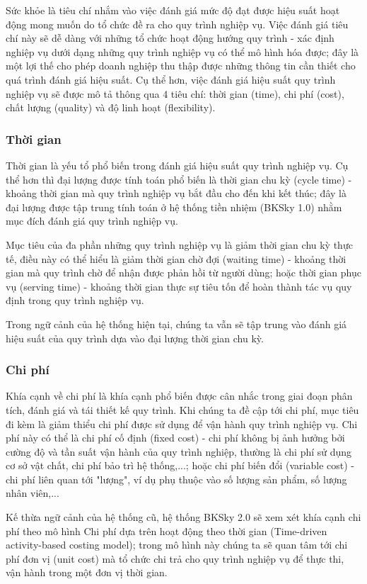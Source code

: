 Sức khỏe là tiêu chí nhắm vào việc đánh giá mức độ đạt được hiệu suất hoạt động
mong muốn do tổ chức đề ra cho quy trình nghiệp vụ. Việc đánh giá tiêu chí này
sẽ dễ dàng với những tổ chức hoạt động hướng quy trình - xác định nghiệp vụ
dưới dạng những quy trình nghiệp vụ có thể mô hình hóa được; đây là một lợi thế
cho phép doanh nghiệp thu thập được những thông tin cần thiết cho quá trình
đánh giá hiệu suất. Cụ thể hơn, việc đánh giá hiệu suất quy trình nghiệp vụ sẽ
được mô tả thông qua 4 tiêu chí: thời gian (time), chi phí (cost), chất lượng
(quality) và độ linh hoạt (flexibility).
\subsubsection{Thời gian}

Thời gian là yếu tổ phổ biến trong đánh giá hiệu suất quy trình nghiệp vụ. Cụ
thể hơn thì đại lượng được tính toán phổ biến là thời gian chu kỳ (cycle time)
- khoảng thời gian mà quy trình nghiệp vụ bắt đầu cho đến khi kết thúc; đây là
đại lượng được tập trung tính toán ở hệ thống tiền nhiệm (BKSky 1.0) nhằm mục
đích đánh giá quy trình nghiệp vụ.

Mục tiêu của đa phần những quy trình nghiệp vụ là giảm thời gian chu kỳ thực
tế, điều này có thể hiểu là giảm thời gian chờ đợi (waiting time) - khoảng thời
gian mà quy trình chờ để nhận được phản hồi từ người dùng; hoặc thời gian phục
vụ (serving time) - khoảng thời gian thực sự tiêu tốn để hoàn thành tác vụ quy
định trong quy trình nghiệp vụ.

Trong ngữ cảnh của hệ thống hiện tại, chúng ta vẫn sẽ tập trung vào đánh giá
hiệu suất của quy trình dựa vào đại lượng thời gian chu kỳ.
\subsubsection{Chi phí}

Khía cạnh về chi phí là khía cạnh phổ biến được cân nhắc trong giai đoạn phân
tích, đánh giá và tái thiết kế quy trình. Khi chúng ta đề cập tới chi phí, mục
tiêu đi kèm là giảm thiểu chi phí được sử dụng để vận hành quy trình nghiệp vụ.
Chi phí này có thể là chi phí cố định (fixed cost) - chi phí không bị ảnh hưởng
bởi cường độ và tần suất vận hành của quy trình nghiệp, thường là chi phí sử
dụng cơ sở vật chất, chi phí bảo trì hệ thống,...; hoặc chi phí biến đổi
(variable cost) - chi phí liên quan tới "lượng", ví dụ phụ thuộc vào số lượng
sản phẩm, số lượng nhân viên,...

Kế thừa ngữ cảnh của hệ thống cũ, hệ thống BKSky 2.0 sẽ xem xét khía cạnh chi
phí theo mô hình Chi phí dựa trên hoạt động theo thời gian (Time-driven
activity-based costing model); trong mô hình này chúng ta sẽ quan tâm tới chi
phí đơn vị (unit cost) mà tổ chức chi trả cho quy trình nghiệp vụ để thực thi,
vận hành trong một đơn vị thời gian.
